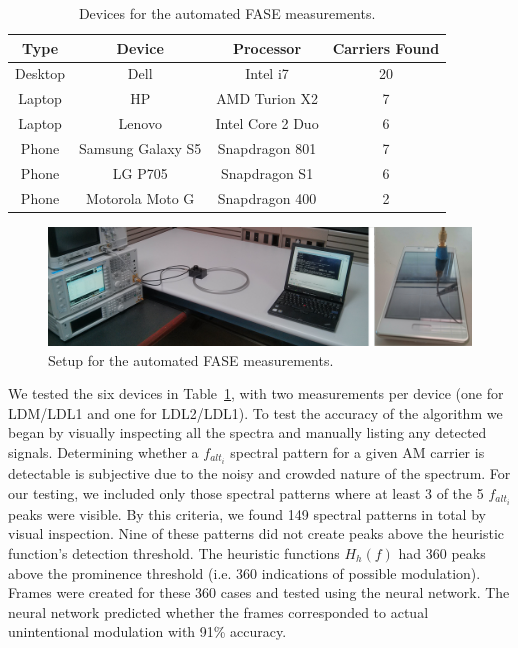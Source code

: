 \begin{table}[htbp]%
  \footnotesize %
  \centering%
    \begin{tabular}{cccc}%
    \toprule
    \textbf{Type} & \textbf{Device} & \textbf{Processor} & \textbf{Carriers Found}\\
    \midrule
    Desktop & Dell & Intel i7 & 20 \\
    Laptop & HP & AMD Turion X2 & 7 \\
    Laptop & Lenovo & Intel Core 2 Duo & 6 \\
    Phone & Samsung Galaxy S5 & Snapdragon 801 & 7 \\
    Phone & LG P705 & Snapdragon S1 & 6 \\
    Phone & Motorola Moto G & Snapdragon 400 & 2 \\
    \bottomrule
    \end{tabular}%
  \caption{Devices for the automated FASE measurements.}%
  \label{fase_pc_specs}%
\end{table}%

\begin{figure}[htb]
\centering
\includegraphics[width=5in]{../eucap_fase/setup.png}
\caption{Setup for the automated FASE measurements.}
\label{fase_auto_setup}
\end{figure}



We tested the six devices in Table~\ref{fase_pc_specs}, with two measurements per device (one for LDM/LDL1 and one for LDL2/LDL1). To test the accuracy of the algorithm we began by visually inspecting all the spectra and manually listing any detected signals. Determining whether a $f_{alt_i}$ spectral pattern for a given AM carrier is detectable is subjective due to the noisy and crowded nature of the spectrum. For our testing, we included only those spectral patterns where at least 3 of the 5 $f_{alt_i}$ peaks were visible. By this criteria, we found 149 spectral patterns in total by visual inspection. Nine of these patterns did not create peaks above the heuristic function's detection threshold. The heuristic functions $H_h(f)$ had 360 peaks above the prominence threshold (i.e. 360 indications of possible modulation). Frames were created for these 360 cases and tested using the neural network. The neural network predicted whether the frames corresponded to actual unintentional modulation with 91\% accuracy.

